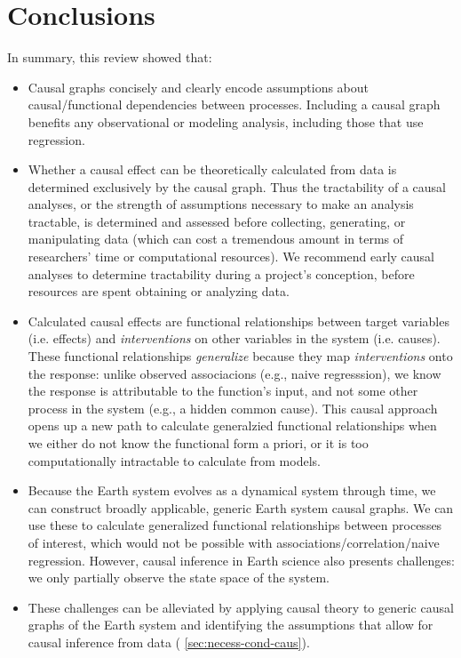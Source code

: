 \documentclass[12pt]{article}
\begin{document}
\section{Conclusions}

In summary, this review showed that:

\begin{itemize}
\item Causal graphs concisely and clearly encode assumptions about
  causal/functional dependencies between processes. Including a causal
  graph benefits any observational or modeling analysis, including
  those that use regression.
\item Whether a causal effect can be theoretically calculated from
  data is determined exclusively by the causal graph. Thus the
  tractability of a causal analyses, or the strength of assumptions
  necessary to make an analysis tractable, is determined and assessed
  before collecting, generating, or manipulating data (which can cost
  a tremendous amount in terms of researchers' time or computational
  resources). We recommend early causal analyses to determine
  tractability during a project's conception, before resources are
  spent obtaining or analyzing data.
\item Calculated causal effects are functional relationships between
  target variables (i.e. effects) and \textit{interventions} on other
  variables in the system (i.e. causes). These functional
  relationships \textit{generalize} because they map
  \textit{interventions} onto the response: unlike observed
  associacions (e.g., naive regresssion), we know the response is
  attributable to the function's input, and not some other process in
  the system (e.g., a hidden common cause). This causal approach opens
  up a new path to calculate generalzied functional relationships when
  we either do not know the functional form a priori, or it is too
  computationally intractable to calculate from models.
\item Because the Earth system evolves as a dynamical system through
  time, we can construct broadly applicable, generic Earth system
  causal graphs. We can use these to calculate generalized functional
  relationships between processes of interest, which would not be
  possible with associations/correlation/naive regression. However,
  causal inference in Earth science also presents challenges: we only
  partially observe the state space of the system.
\item These challenges can be alleviated by applying causal theory to
  generic causal graphs of the Earth system and identifying the
  assumptions that allow for causal inference from data (\Section
  \ref{sec:necess-cond-caus}).
\end{itemize}
\end{document}
